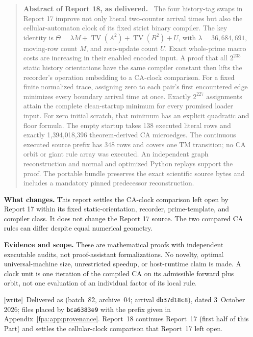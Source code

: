 \documentclass[11pt,a4paper]{article}
\numberwithin{equation}{section}
\newcommand{\TV}{\operatorname{TV}}
\newcommand{\lam}{\lambda}
\newcommand{\wtag}{\textup{[write]}}
\newenvironment{reportabstract}[1]{\begin{quote}\small\textbf{Abstract of Report #1, as delivered.}\ }{\end{quote}}
\begin{document}
\begin{reportabstract}{18}
The four history-tag swaps in Report 17 improve not only literal two-counter
arrival times but also the cellular-automaton clock of its fixed strict binary
compiler. The key identity is
$\Theta=\lam M+\TV(A^2)+\TV(B^2)+U$, with
$\lam=36{,}684{,}691$, moving-row count $M$, and zero-update count $U$.
Exact whole-prime macro costs are increasing in their enabled encoded input.
A proof that all $2^{233}$ static history orientations have the same compiler
constant then lifts the recorder's operation embedding to a CA-clock
comparison. For a fixed finite normalized trace, assigning zero to each
pair's first encountered edge minimizes every boundary arrival time at once.
Exactly $2^{227}$ assignments attain the complete clean-startup minimum
for every promised loader input. For zero initial scratch, that minimum
has an explicit quadratic and floor formula. The empty startup takes
138 executed literal rows and exactly 1,394,018,396 theorem-derived CA
microedges. The continuous executed source prefix has 348 rows and covers
one TM transition; no CA orbit or giant rule array was executed.
An independent graph reconstruction and normal and optimized Python replays
support the proof. The portable bundle preserves the exact scientific
source bytes and includes a mandatory pinned predecessor reconstruction.
\end{reportabstract}

\textbf{What changes.} This report settles the CA-clock comparison left open
by Report 17 within its fixed static-orientation, recorder, prime-template,
and compiler class. It does not change the Report 17 source. The two
compared CA rules can differ despite equal numerical geometry.

\textbf{Evidence and scope.} These are mathematical proofs with independent
executable audits, not proof-assistant formalizations. No novelty, optimal
universal-machine size, unrestricted speedup, or host-runtime claim is made.
A clock unit is one iteration of the compiled CA on its admissible forward
plus orbit, not one evaluation of an individual factor of its local rule.

\wtag\ Delivered as  (batch~82, archive~04; arrival \texttt{db37d18c8}), dated 3~October 2026; files placed by \texttt{bca6383e9} with the prefix given in Appendix~\ref{fpa:app:provenance}. Report~18 continues Report~17 (first half of this Part) and settles the cellular-clock comparison that Report~17 left open.
\end{document}

